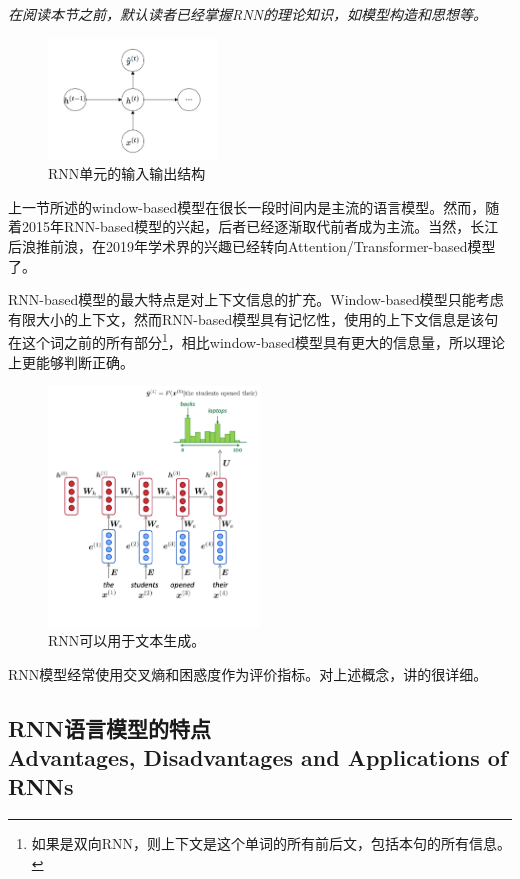 \textit{在阅读本节之前，默认读者已经掌握RNN的理论知识，如模型构造和思想等。}

\begin{figure}[!htbp]
\centering
\includegraphics[width = 0.4\textwidth]{chap-05/05-RNN.png}
\caption{RNN单元的输入输出结构}
\label{05-RNN}
\end{figure}

上一节所述的window-based模型在很长一段时间内是主流的语言模型。然而，随着2015年RNN-based模型的兴起，后者已经逐渐取代前者成为主流。当然，长江后浪推前浪，在2019年学术界的兴趣已经转向Attention/Transformer-based模型了。

RNN-based模型的最大特点是对上下文信息的扩充。Window-based模型只能考虑有限大小的上下文，然而RNN-based模型具有记忆性，使用的上下文信息是该句在这个词之前的所有部分\footnote{如果是双向RNN，则上下文是这个单词的所有前后文，包括本句的所有信息。}，相比window-based模型具有更大的信息量，所以理论上更能够判断正确。

\begin{figure}[!htbp]
\centering
\includegraphics[width = 0.5\textwidth]{chap-05/05-prediction.png}
\caption{RNN可以用于文本生成。}
\label{05-prediction}
\end{figure}

RNN模型经常使用交叉熵和困惑度作为评价指标。对上述概念，\cite{05-tj}讲的很详细。

\subsection{RNN语言模型的特点 \\ Advantages, Disadvantages and Applications of RNNs}

